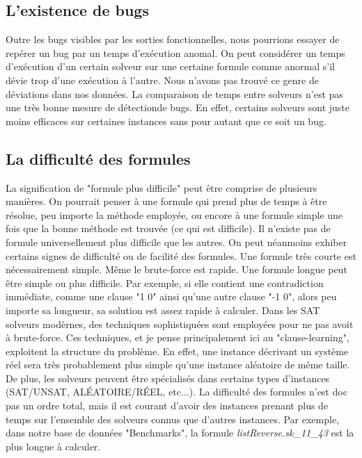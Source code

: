 \documentclass[11pt,a4paper]{article}
\begin{document}
\subsection{L'existence de bugs}
 
Outre les bugs visibles par les sorties fonctionnelles, nous pourrions essayer de repérer un bug par un temps d'exécution anomal. On peut considérer un temps d'exécution d'un certain solveur sur une certaine formule comme anormal s'il dévie trop d'une exécution à l'autre. Nous n'avons pas trouvé ce genre de déviations dans nos données. 
La comparaison de temps entre solveurs n'est pas une très bonne mesure de détectionde bugs. En effet, certains solveurs sont juste moins efficaces sur certaines instances sans pour autant que ce soit un bug.


\subsection{La difficulté des formules}

 La signification de "formule plus difficile" peut être comprise de plusieurs manières. On pourrait penser à une formule qui prend plus de temps à être résolue, peu importe la méthode employée, ou encore à une formule simple une fois que la bonne méthode est trouvée (ce qui est difficile). 
 Il n'existe pas de formule universellement plus difficile que les autres. On peut néanmoins exhiber certains signes de difficulté ou de facilité des formules. 
 Une formule très courte est nécessairement simple. Même le brute-force est rapide.
 Une formule longue peut être simple ou plus difficile. Par exemple, si elle contient une contradiction immédiate, comme une clause "1 0" ainsi qu'une autre clause "-1 0", alors peu importe sa longueur, sa solution est assez rapide à calculer. Dans les SAT solveurs modèrnes, des techniques sophistiquées sont employées pour ne pas avoit à brute-force. Ces techniques, et je pense principalement ici au "clause-learning", exploitent la structure du problème. En effet, une instance décrivant un système réel sera très probablement plus simple qu'une instance aléatoire de même taille. 
De plus, les solveurs peuvent être spécialisés dans certains types d'instances (SAT/UNSAT, ALÉATOIRE/RÉEL, etc...).
La difficulté des formules n'est doc pas un ordre total, mais il est courant d'avoir des instances prenant plus de temps sur l'ensemble des solveurs connus que d'autres instances. Par exemple, dans notre base de données "Benchmarks", la formule \textit{listReverse.sk\_11\_43} est la plus longue à calculer.
\end{document}
